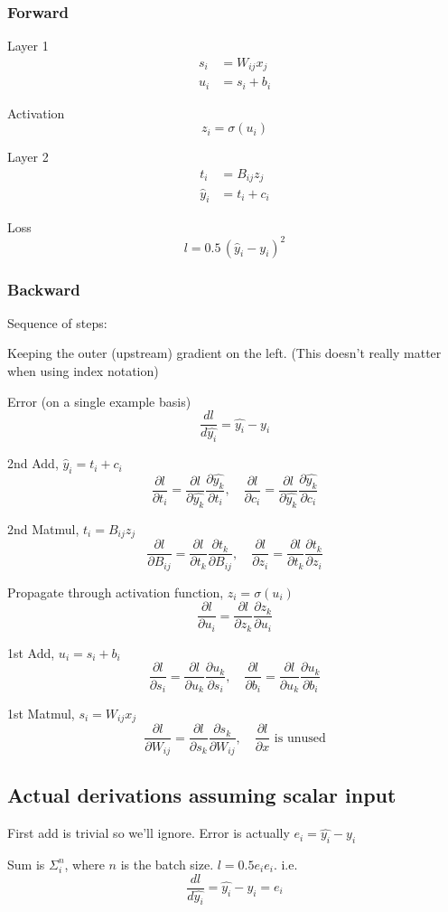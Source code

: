 \documentclass[11pt]{article}
\newcommand{\pd}[2]{\frac{\partial #1}{\partial #2}}
\begin{document}
\subsubsection*{Forward}

Layer 1
\begin{align*}
s_i &= W_{ij} x_j \\
u_i &= s_i + b_i
\end{align*}

Activation
\[
z_i = \sigma(u_i)
\]

Layer 2
\begin{align*}
t_i &= B_{ij} z_j \\
\hat{y}_i &= t_i + c_i
\end{align*}

Loss
\[
l = 0.5\,(\hat{y}_i - y_i)^2
\]

\subsubsection*{Backward}
Sequence of steps:

Keeping the outer (upstream) gradient on the left. (This doesn't really matter
when using index notation)

Error (on a single example basis)
\[
\frac{dl}{d\hat{y_i}} = \hat{y_i} - y_i
\]

2nd Add, $\hat{y}_i = t_i + c_i$
\[
\pd{l}{t_i} = \pd{l}{\hat{y_k}} \pd{\hat{y_k}}{t_i}, \quad \pd{l}{c_i} = \pd{l}{\hat{y_k}} \pd{\hat{y_k}}{c_i}
\]

2nd Matmul, $t_i = B_{ij} z_j$
\[
\pd{l}{B_{ij}} = \pd{l}{t_k} \pd{t_k}{B_{ij}}, \quad \pd{l}{z_i} = \pd{l}{t_k} \pd{t_k}{z_i}
\]

Propagate through activation function, $z_i = \sigma(u_i)$
\[
\pd{l}{u_i} = \pd{l}{z_k}\pd{z_k}{u_i}
\]

1st Add, $u_i = s_i + b_i$
\[
\pd{l}{s_i} = \pd{l}{u_k} \pd{u_k}{s_i} , \quad \pd{l}{b_i} = \pd{l}{u_k} \pd{u_k}{b_i}
\]

1st Matmul, $s_i = W_{ij} x_j$
\[
\pd{l}{W_{ij}} = \pd{l}{s_k}\pd{s_k}{W_{ij}}, \quad \pd{l}{x} \text{ is unused}
\]

\subsection{Actual derivations assuming scalar input}
First add is trivial so we'll ignore. Error is actually $e_i = \hat{y_i} - y_i$

Sum is $\Sigma_i^n$, where $n$ is the batch size. $l = 0.5e_i e_i$. i.e.
\[
\frac{dl}{d\hat{y_i}} = \hat{y_i} - y_i = e_i
\]
\end{document}
